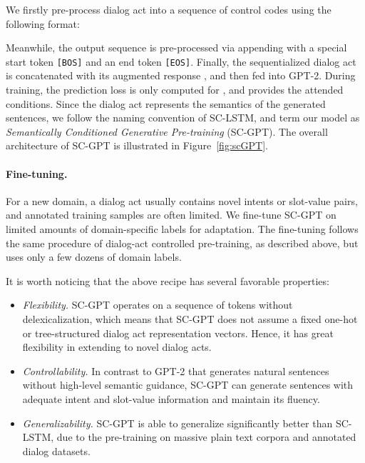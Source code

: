 \documentclass[11pt,a4paper]{article}
\begin{document}
We firstly pre-process dialog act  into a sequence of control codes using the following format: 

Meanwhile, the output sequence  is pre-processed via appending  with a special start token \texttt{[BOS]} and an end token \texttt{[EOS]}.  Finally, the sequentialized dialog act  is concatenated with its augmented response , and then fed into GPT-2. During training, the prediction loss is only computed for , and  provides the attended conditions. 
Since the dialog act represents the semantics of the generated sentences, we follow the naming convention of SC-LSTM, and term our model as {\it Semantically Conditioned Generative Pre-training} (SC-GPT). 
The overall architecture of SC-GPT is illustrated in Figure~\ref{fig:scGPT}.






\paragraph{Fine-tuning.} For a new domain, a dialog act usually contains novel intents or slot-value pairs, and annotated training samples are often limited. We fine-tune SC-GPT on limited amounts of domain-specific labels for adaptation. 
The fine-tuning follows the same procedure of dialog-act controlled pre-training, as described above, but uses only a few dozens of domain labels.  


It is worth noticing that the above recipe has several favorable properties:


\begin{itemize}
\setlength{\itemsep}{-3pt}
    \item {\it Flexibility.} SC-GPT operates on a sequence of tokens without delexicalization, which means that SC-GPT does not assume a fixed one-hot or tree-structured dialog act representation vectors. Hence, it has great flexibility in extending to novel dialog acts. 
    \item {\it Controllability.} In contrast to GPT-2 that generates natural sentences without high-level semantic guidance, SC-GPT can generate sentences with adequate intent and slot-value information and maintain its fluency.
\item {\it Generalizability.}  SC-GPT is able to generalize significantly better than SC-LSTM, due to the pre-training on massive plain text corpora and annotated dialog datasets.
\end{itemize}
\end{document}

